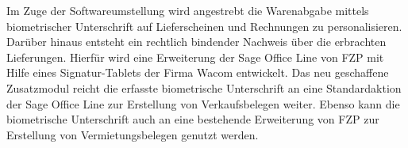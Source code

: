 Im Zuge der Softwareumstellung wird angestrebt die Warenabgabe mittels biometrischer Unterschrift auf Lieferscheinen und Rechnungen zu personalisieren. Darüber hinaus entsteht ein rechtlich bindender Nachweis über die erbrachten Lieferungen. Hierfür wird eine Erweiterung der Sage Office Line von FZP mit Hilfe eines Signatur-Tablets der Firma Wacom entwickelt. Das neu geschaffene Zusatzmodul reicht die erfasste biometrische Unterschrift an eine Standardaktion der Sage Office Line zur Erstellung von Verkaufsbelegen weiter. Ebenso kann die biometrische Unterschrift auch an eine bestehende Erweiterung von FZP zur Erstellung von Vermietungsbelegen genutzt werden. \cite{einleitung1}